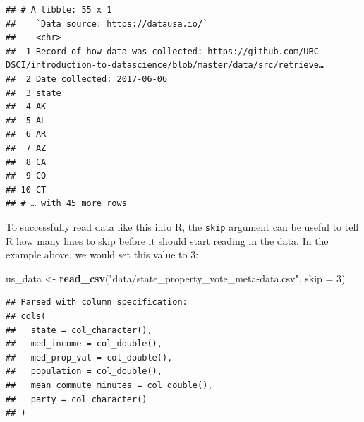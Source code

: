 \documentclass[
]{article}
\newenvironment{Shaded}{\begin{snugshade}}{\end{snugshade}}
\newcommand{\DataTypeTok}[1]{\textcolor[rgb]{0.13,0.29,0.53}{#1}}
\newcommand{\DecValTok}[1]{\textcolor[rgb]{0.00,0.00,0.81}{#1}}
\newcommand{\KeywordTok}[1]{\textcolor[rgb]{0.13,0.29,0.53}{\textbf{#1}}}
\newcommand{\NormalTok}[1]{#1}
\newcommand{\StringTok}[1]{\textcolor[rgb]{0.31,0.60,0.02}{#1}}
\begin{document}
\begin{verbatim}
## # A tibble: 55 x 1
##    `Data source: https://datausa.io/`                                                                                      
##    <chr>                                                                                                                   
##  1 Record of how data was collected: https://github.com/UBC-DSCI/introduction-to-datascience/blob/master/data/src/retrieve…
##  2 Date collected: 2017-06-06                                                                                              
##  3 state                                                                                                                   
##  4 AK                                                                                                                      
##  5 AL                                                                                                                      
##  6 AR                                                                                                                      
##  7 AZ                                                                                                                      
##  8 CA                                                                                                                      
##  9 CO                                                                                                                      
## 10 CT                                                                                                                      
## # … with 45 more rows
\end{verbatim}

To successfully read data like this into R, the \texttt{skip} argument
can be useful to tell R how many lines to skip before it should start
reading in the data. In the example above, we would set this value to 3:

\begin{Shaded}
\begin{Highlighting}[]
\NormalTok{us\_data <{-}}\StringTok{ }\KeywordTok{read\_csv}\NormalTok{(}\StringTok{"data/state\_property\_vote\_meta{-}data.csv"}\NormalTok{, }\DataTypeTok{skip =} \DecValTok{3}\NormalTok{)}
\end{Highlighting}
\end{Shaded}

\begin{verbatim}
## Parsed with column specification:
## cols(
##   state = col_character(),
##   med_income = col_double(),
##   med_prop_val = col_double(),
##   population = col_double(),
##   mean_commute_minutes = col_double(),
##   party = col_character()
## )
\end{verbatim}
\end{document}
